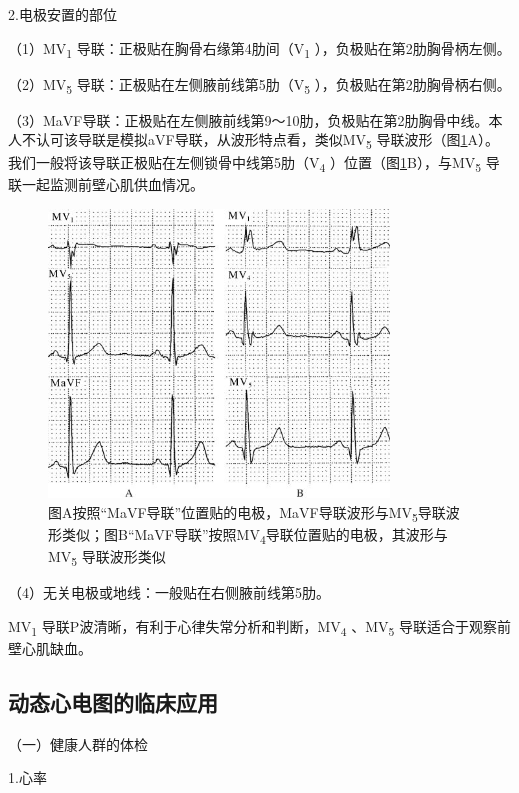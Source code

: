 2.电极安置的部位

（1）MV\textsubscript{1}
导联：正极贴在胸骨右缘第4肋间（V\textsubscript{1}
），负极贴在第2肋胸骨柄左侧。

（2）MV\textsubscript{5}
导联：正极贴在左侧腋前线第5肋（V\textsubscript{5}
），负极贴在第2肋胸骨柄右侧。

（3）MaVF导联：正极贴在左侧腋前线第9～10肋，负极贴在第2肋胸骨中线。本人不认可该导联是模拟aVF导联，从波形特点看，类似MV\textsubscript{5}
导联波形（图\ref{fig47-8}A）。我们一般将该导联正极贴在左侧锁骨中线第5肋（V\textsubscript{4}
）位置（图\ref{fig47-8}B），与MV\textsubscript{5} 导联一起监测前壁心肌供血情况。

\begin{figure}[!htbp]
 \centering
 \includegraphics[width=3.5625in,height=3.02083in]{./images/Image00745.jpg}
 \captionsetup{justification=centering}
 \caption{图A按照“MaVF导联”位置贴的电极，MaVF导联波形与MV\textsubscript{5}导联波形类似；图B“MaVF导联”按照MV\textsubscript{4}导联位置贴的电极，其波形与MV\textsubscript{5} 导联波形类似}
 \label{fig47-8}
  \end{figure} 


（4）无关电极或地线：一般贴在右侧腋前线第5肋。

MV\textsubscript{1}
导联P波清晰，有利于心律失常分析和判断，MV\textsubscript{4}
、MV\textsubscript{5} 导联适合于观察前壁心肌缺血。

\protect\hypertarget{text00056.htmlux5cux23subid674}{}{}

\subsection{动态心电图的临床应用}

（一）健康人群的体检

1.心率

